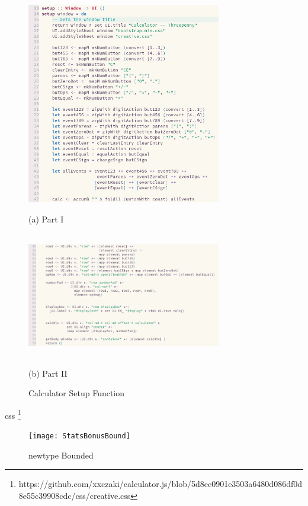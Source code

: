 \documentclass{article}
\begin{document}
\begin{normalsize}
    \begin{figure}[H]

    \begin{minipage}[b]{0.48\linewidth}
      \centering
      \centerline{\includegraphics[width=8.5cm]{calcsetup1}}
      \centerline{ (a) Part I}\medskip
    \end{minipage}
    \hfill
    \begin{minipage}[b]{0.48\linewidth}
      \centering
      \centerline{\includegraphics[width=8.5cm,height=5.5cm]{calcsetup2}}
      \centerline{ (b) Part II }\medskip
    \end{minipage}
    \caption{Calculator Setup Function}
    \label{fig:dinning}
  \end{figure}


  css \footnote[]{https://github.com/xxczaki/calculator.js/blob/5d8ec0901e3503a6480d086df0d8e55c39908cdc/css/creative.css}
  
  \begin{figure}[H]
    \centering
    \centerline{\texttt{[image: StatsBonusBound]}}
    \caption{newtype Bounded}
    \label{fig:bounded}
  \end{figure}


\end{normalsize}
\end{document}
